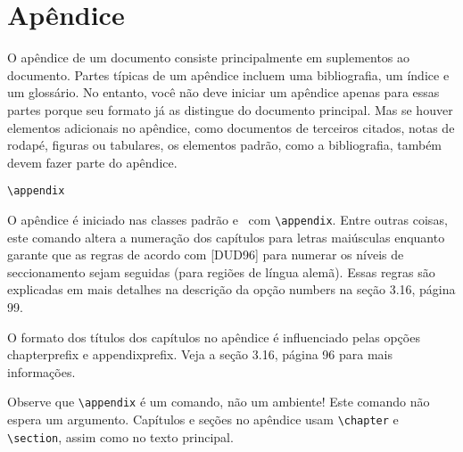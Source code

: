 \chapter{Apêndice}
O apêndice de um documento consiste principalmente em suplementos ao documento. Partes típicas de um apêndice incluem uma bibliografia, um índice e um glossário. No entanto, você não deve iniciar um apêndice apenas para essas partes porque seu formato já as distingue do documento principal. Mas se houver elementos adicionais no apêndice, como documentos de terceiros citados, notas de rodapé, figuras ou tabulares, os elementos padrão, como a bibliografia, também devem fazer parte do apêndice.

\verb|\appendix|

O apêndice é iniciado nas classes padrão e \KOMAScript\ com \verb|\appendix|. Entre outras coisas, este comando altera a numeração dos capítulos para letras maiúsculas enquanto garante que as regras de acordo com [DUD96] para numerar os níveis de seccionamento sejam seguidas (para regiões de língua alemã). Essas regras são explicadas em mais detalhes na descrição da opção numbers na seção 3.16, página 99.

O formato dos títulos dos capítulos no apêndice é influenciado pelas opções chapterprefix e appendixprefix. Veja a seção 3.16, página 96 para mais informações.

Observe que \verb|\appendix| é um comando, não um ambiente! Este comando não espera um argumento. Capítulos e seções no apêndice usam \verb|\chapter| e \verb|\section|, assim como no texto principal.
